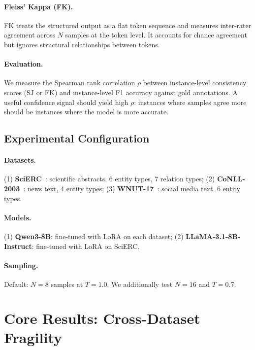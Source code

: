 \documentclass[11pt,a4paper]{article}
\begin{document}
\paragraph{Fleiss' Kappa (FK).}
FK treats the structured output as a flat token sequence and measures inter-rater agreement across $N$ samples at the token level.
It accounts for chance agreement but ignores structural relationships between tokens.

\paragraph{Evaluation.}
We measure the Spearman rank correlation $\rho$ between instance-level consistency scores (SJ or FK) and instance-level F1 accuracy against gold annotations.
A useful confidence signal should yield high $\rho$: instances where samples agree more should be instances where the model is more accurate.

\subsection{Experimental Configuration}

\paragraph{Datasets.}
(1) \textbf{SciERC}~\cite{luan2018multi}: scientific abstracts, 6 entity types, 7 relation types;
(2) \textbf{CoNLL-2003}~\cite{tjong2003introduction}: news text, 4 entity types;
(3) \textbf{WNUT-17}~\cite{derczynski2017results}: social media text, 6 entity types.

\paragraph{Models.}
(1) \textbf{Qwen3-8B}: fine-tuned with LoRA on each dataset;
(2) \textbf{LLaMA-3.1-8B-Instruct}: fine-tuned with LoRA on SciERC.

\paragraph{Sampling.}
Default: $N{=}8$ samples at $T{=}1.0$.
We additionally test $N{=}16$ and $T{=}0.7$.

\section{Core Results: Cross-Dataset Fragility}
\label{sec:cross_dataset}
\end{document}
